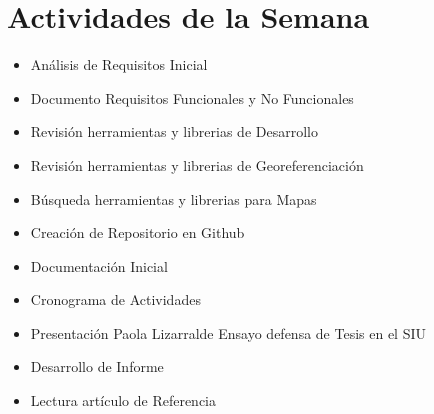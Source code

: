 \section{Actividades de la Semana}


\begin{itemize}

\item Análisis de Requisitos Inicial

\item Documento Requisitos Funcionales y No Funcionales

\item Revisión herramientas y librerias de Desarrollo 

\item Revisión herramientas y librerias de Georeferenciación

\item Búsqueda herramientas y librerias  para Mapas

\item Creación de Repositorio en Github

\item Documentación Inicial

\item Cronograma de Actividades

\item Presentación Paola Lizarralde Ensayo defensa de Tesis en el SIU

\item Desarrollo de Informe

\item Lectura artículo de Referencia\cite{scavuzzoalgoritmos}

\end{itemize}
